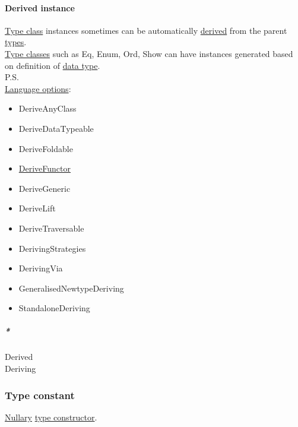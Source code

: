 \documentclass[11pt]{article}
\begin{document}
\paragraph{\label{org0d365e3}Derived instance}
\label{sec:org8b5926e}
\hyperref[org16d8a26]{Type class} instances sometimes can be automatically \hyperref[org8c97145]{derived} from the parent \hyperref[org4209edd]{types}.\\

\hyperref[orgead20df]{Type classes} such as Eq, Enum, Ord, Show can have instances generated based on definition of \hyperref[org212d9c3]{data type}.\\

P.S.\\

\hyperref[org77b1d95]{Language options}:\\
\begin{itemize}
\item DeriveAnyClass\\
\item DeriveDataTypeable\\
\item DeriveFoldable\\
\item \hyperref[orgccdf8f2]{DeriveFunctor}\\
\item DeriveGeneric\\
\item DeriveLift\\
\item DeriveTraversable\\
\item DerivingStrategies\\
\item DerivingVia\\
\item GeneralisedNewtypeDeriving\\
\item StandaloneDeriving\\
\end{itemize}

\subparagraph{\emph{*}}
\label{sec:org3e22497}

\label{org8c97145}Derived\\
\label{orgab79d7a}Deriving\\

\subsubsection{\label{org21f5cab}Type constant}
\label{sec:orgea83425}
\hyperref[org2fb9b13]{Nullary} \hyperref[org385fa30]{type constructor}.\\
\end{document}
